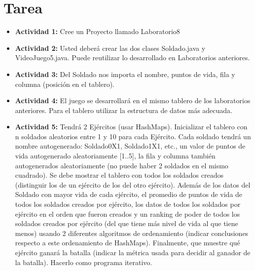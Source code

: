 \documentclass{article}
\begin{document}
\section{Tarea}
\begin{itemize}
	\item \textbf{Actividad 1:} Cree un Proyecto llamado Laboratorio8
	\item \textbf{Actividad 2:} Usted deberá crear las dos clases Soldado.java y VideoJuego5.java. Puede reutilizar lo
	      desarrollado en Laboratorios anteriores.
	\item \textbf{Actividad 3:} Del Soldado nos importa el nombre, puntos de vida, fila y columna (posición en el tablero).
	\item \textbf{Actividad 4:} El juego se desarrollará en el mismo tablero de los laboratorios anteriores.
	      Para el tablero utilizar la estructura de datos más adecuada.
	\item \textbf{Actividad 5:} Tendrá 2 Ejércitos (usar HashMaps). Inicializar el tablero con n soldados aleatorios entre 1 y
	      10 para cada Ejército. Cada soldado tendrá un nombre autogenerado: Soldado0X1,
	      Soldado1X1, etc., un valor de puntos de vida autogenerado aleatoriamente [1..5], la fila y
	      columna también autogenerados aleatoriamente (no puede haber 2 soldados en el mismo
	      cuadrado). Se debe mostrar el tablero con todos los soldados creados (distinguir los de un
	      ejército de los del otro ejército). Además de los datos del Soldado con mayor vida de cada
	      ejército, el promedio de puntos de vida de todos los soldados creados por ejército, los datos
	      de todos los soldados por ejército en el orden que fueron creados y un ranking de poder de
	      todos los soldados creados por ejército (del que tiene más nivel de vida al que tiene menos)
	      usando 2 diferentes algoritmos de ordenamiento (indicar conclusiones respecto a este
	      ordenamiento de HashMaps). Finalmente, que muestre qué ejército ganará la batalla (indicar
	      la métrica usada para decidir al ganador de la batalla). Hacerlo como programa iterativo.
\end{itemize}
\pagebreak
\end{document}
